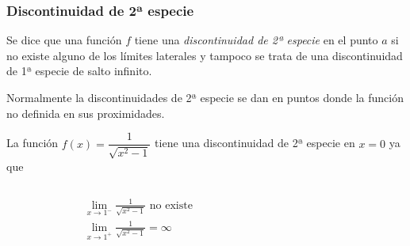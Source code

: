 \begin{frame}
\frametitle{Discontinuidad de 2ª especie}
\begin{definicion}
Se dice que una función $f$ tiene una \emph{discontinuidad de 2ª especie} en el punto $a$ si
no existe alguno de los límites laterales y tampoco se trata de una discontinuidad de 1ª especie de salto infinito.
\end{definicion}

Normalmente la discontinuidades de 2ª especie se dan en puntos donde la función no definida en sus proximidades.

 La función $f(x)=\dfrac{1}{\sqrt{x^2-1}}$ tiene una discontinuidad de 2ª especie en $x=0$ ya que
\begin{columns}
\begin{column}{0.3\textwidth}
\begin{align*}
& \lim_{x\rightarrow 1^-}\frac{1}{\sqrt{x^2-1}} \textrm{ no existe}  \\
& \lim_{x\rightarrow 1^+}\frac{1}{\sqrt{x^2-1}}=\infty
\end{align*}
\end{column}
\begin{column}{0.5\textwidth}
\begin{center}
\scalebox{1}{}
\end{center}
\end{column}
\end{columns}
\end{frame} 
